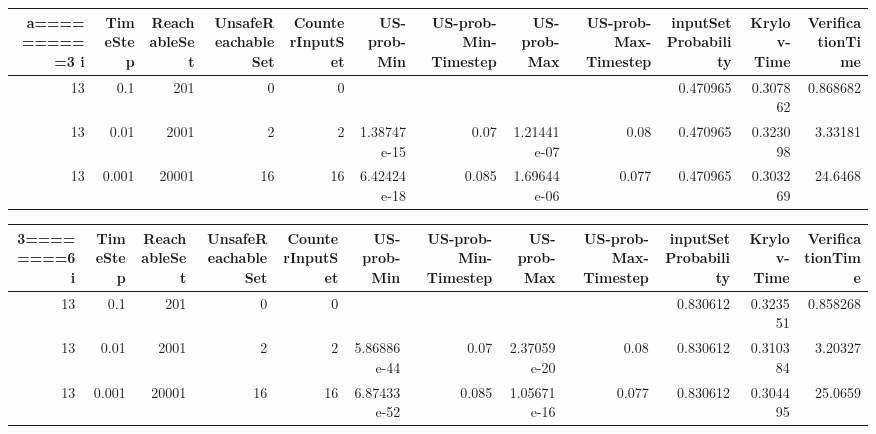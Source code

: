 \begin{tabular}{rrrrrrrrrrrr}
\hline a==========3
   i &   TimeStep &   ReachableSet &   UnsafeReachableSet &   CounterInputSet &   US-prob-Min &   US-prob-Min-Timestep &   US-prob-Max &   US-prob-Max-Timestep &   inputSet Probability &   Krylov-Time &   VerificationTime \\
\hline
  13 &      0.1   &            201 &                    0 &                 0 &               &                        &               &                        &               0.470965 &      0.307862 &           0.868682 \\
  13 &      0.01  &           2001 &                    2 &                 2 &   1.38747e-15 &                  0.07  &   1.21441e-07 &                  0.08  &               0.470965 &      0.323098 &           3.33181  \\
  13 &      0.001 &          20001 &                   16 &                16 &   6.42424e-18 &                  0.085 &   1.69644e-06 &                  0.077 &               0.470965 &      0.303269 &          24.6468   \\
\hline
\end{tabular}
\begin{tabular}{rrrrrrrrrrrr}
\hline3========6
   i &   TimeStep &   ReachableSet &   UnsafeReachableSet &   CounterInputSet &   US-prob-Min &   US-prob-Min-Timestep &   US-prob-Max &   US-prob-Max-Timestep &   inputSet Probability &   Krylov-Time &   VerificationTime \\
\hline
  13 &      0.1   &            201 &                    0 &                 0 &               &                        &               &                        &               0.830612 &      0.323551 &           0.858268 \\
  13 &      0.01  &           2001 &                    2 &                 2 &   5.86886e-44 &                  0.07  &   2.37059e-20 &                  0.08  &               0.830612 &      0.310384 &           3.20327  \\
  13 &      0.001 &          20001 &                   16 &                16 &   6.87433e-52 &                  0.085 &   1.05671e-16 &                  0.077 &               0.830612 &      0.304495 &          25.0659   \\
\hline
\end{tabular}
